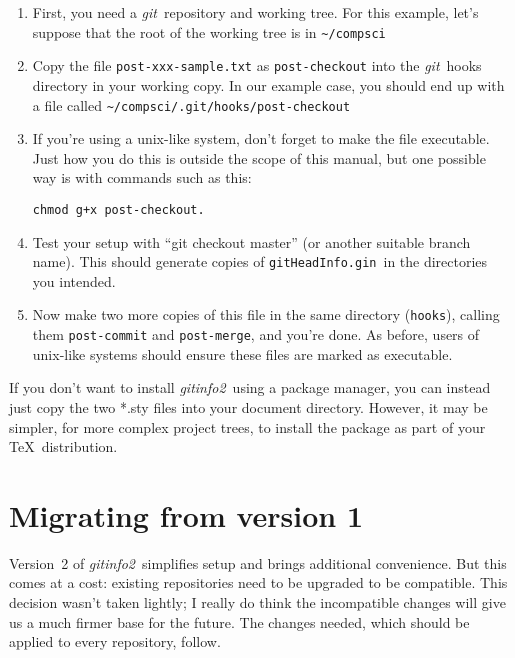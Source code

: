 \documentclass[draft,a4paper,12pt,twoside,openany]{memoir}
\newcommand{\sfit}[1]{\textit{#1}}
\newcommand{\git}{\sfit{git}}
\newcommand{\tpname}{\sfit{gitinfo2}}
\newcommand{\ginname}{gitHeadInfo.gin}
\newcommand{\metaname}{\texttt{\ginname}}
\begin{document}
\begin{enumerate}

\item First, you need a \git\ repository and working tree.
For this example, let's suppose that the root of the working tree is in
\texttt{\textasciitilde/compsci}

\item Copy the file \texttt{post-xxx-sample.txt} as \texttt{post-checkout}
into the \git\ hooks directory in your working copy.
In our example case, you should end up with a file called
\texttt{\textasciitilde/compsci/.git/hooks/post-checkout}

\item If you're using a unix-like system,
don't forget to make the file executable.
Just how you do this is outside the scope of this manual,
but one possible way is with commands such as this:

\begin{verbatim}
chmod g+x post-checkout.
\end{verbatim}

\item Test your setup with ``git checkout master''
(or another suitable branch name).
This should generate copies of \metaname\ in the directories
you intended.

\item Now make two more copies of this file in the same directory (\texttt{hooks}), calling them
\texttt{post-commit} and \texttt{post-merge}, and you're done.
As before, users of unix-like systems should ensure these files are marked as executable.
\end{enumerate}

If you don't want to install \tpname\ using a package manager,
you can instead just copy the two *.sty files into your document directory.
However, it may be simpler, for more complex project trees,
to install the package as part of your \TeX\ distribution.

\section{Migrating from version 1}

Version~2 of \tpname\ simplifies setup and brings additional convenience.
But this comes at a cost:
existing repositories need to be upgraded to be compatible.
This decision wasn't taken lightly; I really do think the incompatible changes
will give us a much firmer base for the future.
The changes needed, which should be applied to every repository, follow.
\end{document}
